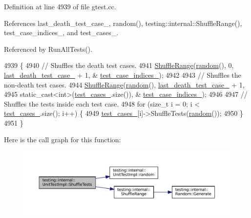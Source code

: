 Definition at line 4939 of file gtest.\+cc.



References last\+\_\+death\+\_\+test\+\_\+case\+\_\+, random(), testing\+::internal\+::\+Shuffle\+Range(), test\+\_\+case\+\_\+indices\+\_\+, and test\+\_\+cases\+\_\+.



Referenced by Run\+All\+Tests().


\begin{DoxyCode}
4939                                 \{
4940   \textcolor{comment}{// Shuffles the death test cases.}
4941   \hyperlink{namespacetesting_1_1internal_a0e1d3dc36138a591769412d4c7779861}{ShuffleRange}(\hyperlink{classtesting_1_1internal_1_1UnitTestImpl_ab3b45b5eb4d583219a3602011ea44347}{random}(), 0, \hyperlink{classtesting_1_1internal_1_1UnitTestImpl_afd663a104bb0a6df2c5143454f78e305}{last\_death\_test\_case\_} + 1, &
      \hyperlink{classtesting_1_1internal_1_1UnitTestImpl_a9b30891f1a9d5b5c25de2bef0f0bb49a}{test\_case\_indices\_});
4942 
4943   \textcolor{comment}{// Shuffles the non-death test cases.}
4944   \hyperlink{namespacetesting_1_1internal_a0e1d3dc36138a591769412d4c7779861}{ShuffleRange}(\hyperlink{classtesting_1_1internal_1_1UnitTestImpl_ab3b45b5eb4d583219a3602011ea44347}{random}(), \hyperlink{classtesting_1_1internal_1_1UnitTestImpl_afd663a104bb0a6df2c5143454f78e305}{last\_death\_test\_case\_} + 1,
4945                static\_cast<int>(\hyperlink{classtesting_1_1internal_1_1UnitTestImpl_a79ec0f733ada2898efd1a7fbd8587fb3}{test\_cases\_}.size()), &
      \hyperlink{classtesting_1_1internal_1_1UnitTestImpl_a9b30891f1a9d5b5c25de2bef0f0bb49a}{test\_case\_indices\_});
4946 
4947   \textcolor{comment}{// Shuffles the tests inside each test case.}
4948   \textcolor{keywordflow}{for} (\textcolor{keywordtype}{size\_t} i = 0; i < \hyperlink{classtesting_1_1internal_1_1UnitTestImpl_a79ec0f733ada2898efd1a7fbd8587fb3}{test\_cases\_}.size(); i++) \{
4949     \hyperlink{classtesting_1_1internal_1_1UnitTestImpl_a79ec0f733ada2898efd1a7fbd8587fb3}{test\_cases\_}[i]->ShuffleTests(\hyperlink{classtesting_1_1internal_1_1UnitTestImpl_ab3b45b5eb4d583219a3602011ea44347}{random}());
4950   \}
4951 \}
\end{DoxyCode}
Here is the call graph for this function\+:
\nopagebreak
\begin{figure}[H]
\begin{center}
\leavevmode
\includegraphics[width=350pt]{classtesting_1_1internal_1_1UnitTestImpl_aaaa38e6a4372e6bb9bbe3143a3a32b65_cgraph}
\end{center}
\end{figure}
